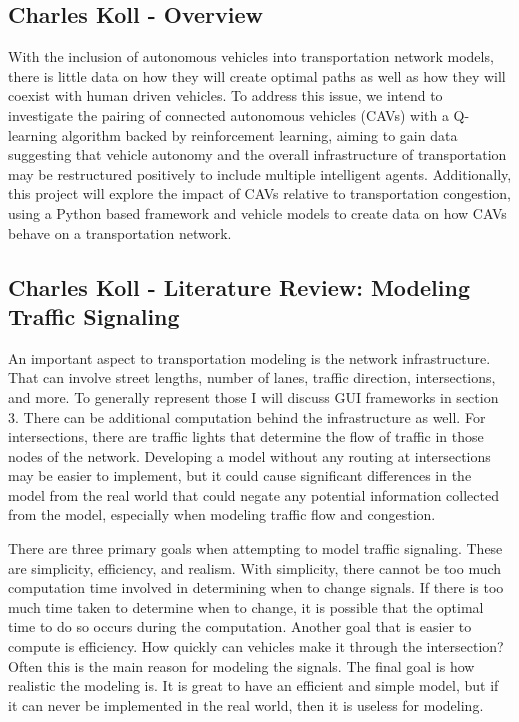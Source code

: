 \documentclass[onecolumn, draftclsnofoot,10pt, compsoc]{IEEEtran}
\begin{document}
\subsection{Charles Koll - Overview}
With the inclusion of autonomous vehicles into transportation network models, there is little data on how they will create optimal paths as well as how they will coexist with human driven vehicles.
To address this issue, we intend to investigate the pairing of connected autonomous vehicles (CAVs) with a Q-learning algorithm backed by reinforcement learning, aiming to gain data suggesting that vehicle autonomy and the overall infrastructure of transportation may be restructured positively to include multiple intelligent agents.
Additionally, this project will explore the impact of CAVs relative to transportation congestion, using a Python based framework and vehicle models to create data on how CAVs behave on a transportation network.
\subsection{Charles Koll - Literature Review: Modeling Traffic Signaling}
An important aspect to transportation modeling is the network infrastructure.
That can involve street lengths, number of lanes, traffic direction, intersections, and more.
To generally represent those I will discuss GUI frameworks in section 3.
There can be additional computation behind the infrastructure as well.
For intersections, there are traffic lights that determine the flow of traffic in those nodes of the network.
Developing a model without any routing at intersections may be easier to implement, but it could cause significant differences in the model from the real world that could negate any potential information collected from the model, especially when modeling traffic flow and congestion.

There are three primary goals when attempting to model traffic signaling.
These are simplicity, efficiency, and realism.
With simplicity, there cannot be too much computation time involved in determining when to change signals.
If there is too much time taken to determine when to change, it is possible that the optimal time to do so occurs during the computation.
Another goal that is easier to compute is efficiency.
How quickly can vehicles make it through the intersection?
Often this is the main reason for modeling the signals.
The final goal is how realistic the modeling is.
It is great to have an efficient and simple model, but if it can never be implemented in the real world, then it is useless for modeling.
\end{document}

